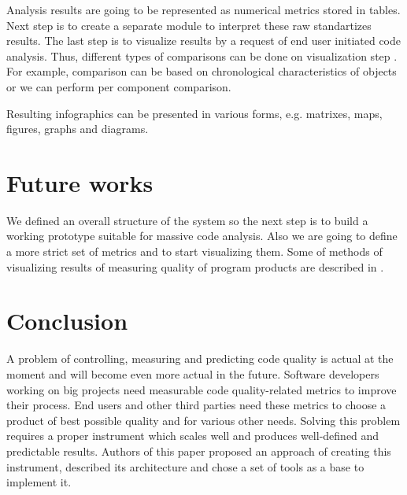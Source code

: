 \documentclass[runningheads,a4paper]{llncs}
\begin{document}
Analysis results are going to be represented as numerical metrics stored in
tables. Next step is to create a separate module to interpret these raw
standartizes results. The last step is to visualize results by a request of
end user initiated code analysis. Thus, different types of comparisons can be
done on visualization step \cite{item17}. For example, comparison can be based
on chronological characteristics of objects or we can perform per component comparison.

Resulting infographics can be presented in various forms, e.g. matrixes, maps,
figures, graphs and diagrams.

\section{Future works}

We defined an overall structure of the system so the next step is
to build a working prototype suitable for massive code analysis. Also
we are going to define a more strict set of metrics and to start
visualizing them. Some of methods of visualizing results of measuring
quality of program products are described in \cite{item18,item19,item20}.

\section{Conclusion}

A problem of controlling, measuring and predicting code quality is actual
at the moment and will become even more actual in the future. Software
developers working on big projects need measurable code quality-related
metrics to improve their process. End users and other third parties need
these metrics to choose a product of best possible quality and for various
other needs. Solving this problem requires a proper instrument which scales
well and produces well-defined and predictable results. Authors of this paper
proposed an approach of creating this instrument, described its architecture
and chose a set of tools as a base to implement it.
\end{document}
